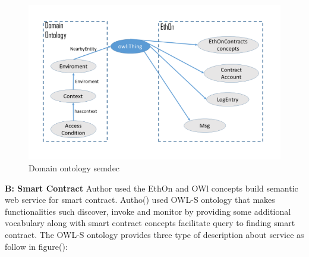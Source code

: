   
 \begin{center}
 	\begin{figure}[htb!]
 		
 		\begin{minipage}{0.55\linewidth}
 			\centering
 			\includegraphics[width=1.95\textwidth]{images/chap02_Domain_EthOn.png}
 		\end{minipage}
 		\caption[Domain ONtology]{Domain ontology semdec}
 		
 	\end{figure}
 	
 \end{center} 
  
 \textbf{B: Smart Contract}
 Author used the EthOn and OWl concepts build semantic web service for smart contract. Autho() used OWL-S ontology that makes functionalities such discover, invoke and monitor by providing some additional vocabulary along with smart contract concepts facilitate query to finding smart contract. The OWL-S ontology provides three type of description about service as follow in figure():\\
 

